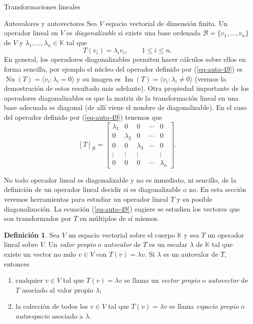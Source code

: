 \documentclass[a4paper,12pt,twoside,spanish,reqno]{amsbook}
\numberwithin{equation}{section}
\theoremstyle{definition}
\newtheorem{definicion}[teorema]{Definici\'on}
\theoremstyle{remark}
\newcommand{\img}{\operatorname{Im}}
\newcommand{\nuc}{\operatorname{Nu}}
\newcommand{\K}{\mathbb K}
\begin{document}
\begin{chapter}{Transformaciones lineales}
\begin{section}{Autovalores y autovectores}
        Sea $V$ espacio vectorial de dimensión finita. Un operador lineal en $V$ es \textit{diagonalizable}  si existe una base ordenada $\mathcal B= \{v_1,\ldots,v_n\}$ de $V$ y $\lambda_1,\ldots,\lambda_n \in \K$ tal que 
        \begin{equation}\label{eq-auto-49}
            T(v_i) = \lambda_i v_i,\qquad 1\le i \le n. 
        \end{equation}
        En  general, los operadores diagonalizables permiten hacer cálculos sobre ellos en forma sencilla, por ejemplo el núcleo del  operador definido por (\ref{eq-auto-49}) es $\nuc(T)=\langle v_i: \lambda_i =0 \rangle$ y  su imagen es $\img(T)=\langle v_i: \lambda_i \not=0 \rangle$ (vermos la demostración de estos resultado más adelante). 
        Otra propiedad importante de los operadores diagonalizables es que la matriz de la transformación lineal en una base adecuada es diagonal (de allí viene el nombre de diagonalizable). En  el caso del  operador definido por (\ref{eq-auto-49}) tenemos que
        $$
        [T]_{\mathcal B} = 
        \begin{bmatrix}
        \lambda_1&0&0&\cdots&0 \\
        0&\lambda_2&0&\cdots&0\\
        0&0&\lambda_3&\cdots&0\\
        \vdots&\vdots&\vdots&&\vdots\\
        0&0&0&\cdots&\lambda_n
        \end{bmatrix}.
        $$
        
        
        No todo operador lineal es diagonalizable y no es inmediato, ni sencillo, de la definición de un operador lineal decidir si es diagonalizable o no. En esta sección veremos herramientas para estudiar un operador lineal $T$ y su posible diagonalización. La ecuación (\ref{eq-auto-49}) sugiere se estudien los vectores que son transformados por $T$ en múltiplos de sí mismos.
        
        \begin{definicion}
            Sea $V$ un espacio vectorial sobre el cuerpo $\K$ y sea $T$ un operador lineal sobre $V$. Un \textit{valor propio} o \textit{autovalor} de $T$ es un escalar $\lambda$ de $\K$ tal que existe un vector no nulo $v \in V$ con $T(v) = \lambda v$. Si $\lambda$ es un autovalor de $T$, entonces
            \begin{enumerate}
                \item  cualquier  $v \in V$ tal que $T(v) = \lambda v$  se llama un \textit{vector propio} o  \textit{autovector} de $T$ asociado al valor propio $\lambda$;
                \item la colección de todos los $v \in V$ tal que $T(v) = \lambda v$  se llama \textit{espacio propio} o \textit{autoespacio} 	asociado a $\lambda$.
            \end{enumerate}
            

\end{definicion}
\end{section}
\end{chapter}
\end{document}
